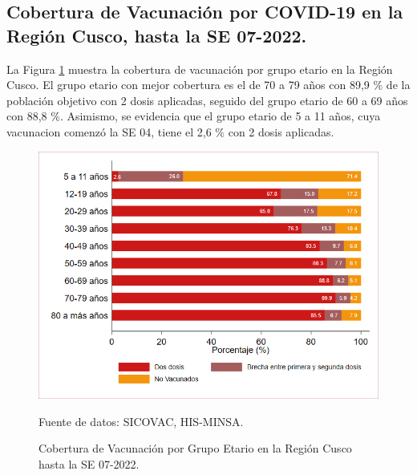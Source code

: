 \documentclass[12pt,a4paper,openany]{book}
\begin{document}
	\subsection*{Cobertura de Vacunación por COVID-19 en la Región Cusco, hasta la SE 07-2022.}
\noindent La Figura \ref{fig:vacuna_edad} muestra la cobertura de vacunación por grupo etario en la Región Cusco. El grupo etario con mejor cobertura es el de 70 a 79 años con 89,9 $\%$ de la población objetivo con 2 dosis aplicadas, seguido del grupo etario de 60 a 69 años con 88,8 $\%$. Asimismo, se evidencia que el grupo etario de 5 a 11 años, cuya vacunacion comenzó la SE 04, tiene el 2,6 $\%$ con 2 dosis aplicadas.  

\begin{figure}[h]
	\caption{Cobertura de Vacunación por Grupo Etario en la Región Cusco hasta la SE 07-2022. }\label{fig:vacuna_edad}
	\begin{center}
		\includegraphics[width=0.90\linewidth]{../figuras/vacunacion_grupo_edad.png}
	\end{center}
	{\footnotesize {Fuente de datos: SICOVAC, HIS-MINSA.}}
\end{figure}
\end{document}
